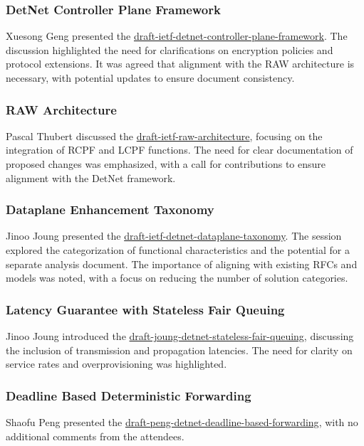 \documentclass{article}
\begin{document}
\subsubsection{DetNet Controller Plane Framework}
Xuesong Geng presented the \href{https://datatracker.ietf.org/doc/html/draft-ietf-detnet-controller-plane-framework}{draft-ietf-detnet-controller-plane-framework}. The discussion highlighted the need for clarifications on encryption policies and protocol extensions. It was agreed that alignment with the RAW architecture is necessary, with potential updates to ensure document consistency.

\subsubsection{RAW Architecture}
Pascal Thubert discussed the \href{https://datatracker.ietf.org/doc/html/draft-ietf-raw-architecture}{draft-ietf-raw-architecture}, focusing on the integration of RCPF and LCPF functions. The need for clear documentation of proposed changes was emphasized, with a call for contributions to ensure alignment with the DetNet framework.

\subsubsection{Dataplane Enhancement Taxonomy}
Jinoo Joung presented the \href{https://datatracker.ietf.org/doc/html/draft-ietf-detnet-dataplane-taxonomy}{draft-ietf-detnet-dataplane-taxonomy}. The session explored the categorization of functional characteristics and the potential for a separate analysis document. The importance of aligning with existing RFCs and models was noted, with a focus on reducing the number of solution categories.

\subsubsection{Latency Guarantee with Stateless Fair Queuing}
Jinoo Joung introduced the \href{https://datatracker.ietf.org/doc/html/draft-joung-detnet-stateless-fair-queuing}{draft-joung-detnet-stateless-fair-queuing}, discussing the inclusion of transmission and propagation latencies. The need for clarity on service rates and overprovisioning was highlighted.

\subsubsection{Deadline Based Deterministic Forwarding}
Shaofu Peng presented the \href{https://datatracker.ietf.org/doc/html/draft-peng-detnet-deadline-based-forwarding}{draft-peng-detnet-deadline-based-forwarding}, with no additional comments from the attendees.
\end{document}
